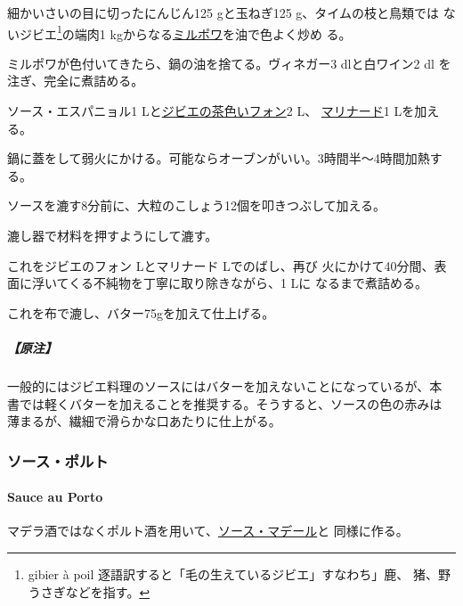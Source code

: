 \begin{recette}
細かいさいの目に切ったにんじん125 gと玉ねぎ125 g、タイムの枝と鳥類では
ないジビエ\footnote{gibier à poil
  逐語訳すると「毛の生えているジビエ」すなわち」鹿、
  猪、野うさぎなどを指す。}の端肉1
kgからなる\protect\hyperlink{mirepoix}{ミルポワ}を油で色よく炒め る。

ミルポワが色付いてきたら、鍋の油を捨てる。ヴィネガー3 dlと白ワイン2 dl
を注ぎ、完全に煮詰める。

ソース・エスパニョル1
Lと\protect\hyperlink{fonds-de-gibier}{ジビエの茶色いフォン}2 L、
\href{}{マリナード}1 Lを加える。

鍋に蓋をして弱火にかける。可能ならオーブンがいい。3時間半〜4時間加熱す
る。

ソースを漉す8分前に、大粒のこしょう12個を叩きつぶして加える。

漉し器で材料を押すようにして漉す。

これをジビエのフォン\unquart{} Lとマリナード\unquart{} Lでのばし、再び
火にかけて40分間、表面に浮いてくる不純物を丁寧に取り除きながら、1 Lに
なるまで煮詰める。

これを布で漉し、バター75gを加えて仕上げる。

\hypertarget{ux539fux6ce8-6}{%
\subparagraph{【原注】}\label{ux539fux6ce8-6}}

一般的にはジビエ料理のソースにはバターを加えないことになっているが、本
書では軽くバターを加えることを推奨する。そうすると、ソースの色の赤みは
薄まるが、繊細で滑らかな口あたりに仕上がる。

\maeaki

\hypertarget{ux30bdux30fcux30b9ux30ddux30ebux30c8}{%
\subsubsection{ソース・ポルト}\label{ux30bdux30fcux30b9ux30ddux30ebux30c8}}

\hypertarget{sauce-au-porto}{%
\paragraph{Sauce au Porto}\label{sauce-au-porto}}

  

マデラ酒ではなくポルト酒を用いて、\protect\hyperlink{sauce-madere}{ソース・マデール}と
同様に作る。

\maeaki

\hypertarget{ux30ddux30ebux30c8ux30acux30ebux98a873ux30bdux30fcux30b9}{%
}
\end{recette}
